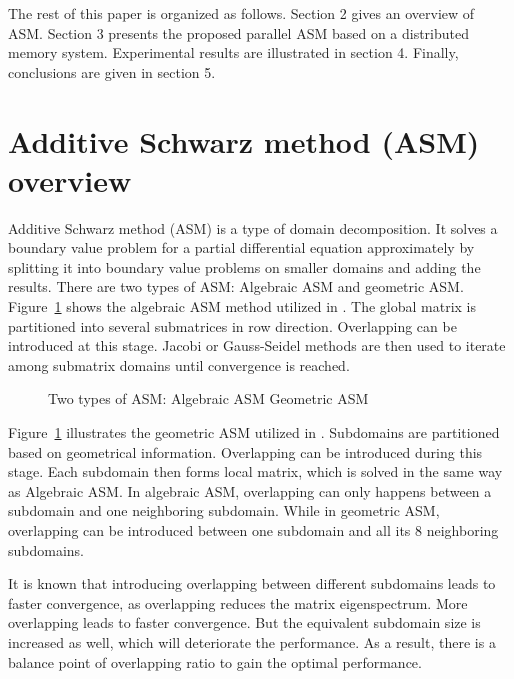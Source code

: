 \documentclass{sig-alternate}
\begin{document}
	The rest of this paper is organized as follows. Section 2 gives an overview of ASM. Section 3 presents 
	the proposed parallel ASM based on a distributed memory system. Experimental results are illustrated in section 4. 
	Finally, conclusions are given in section 5.

\section{Additive Schwarz method (ASM) overview}	
	Additive Schwarz method (ASM) is a type of domain decomposition. It solves a boundary value problem for a partial 
	differential equation approximately by splitting it into boundary value problems on smaller domains and adding the results.
	There are two types of ASM: Algebraic ASM and geometric ASM. 
	Figure~\ref{Fig2} shows the algebraic ASM method utilized in \cite{kaisun}. The global matrix
	is partitioned into several submatrices in row direction. 
	Overlapping can be introduced at this stage. Jacobi or Gauss-Seidel methods are then used to iterate among submatrix domains until 
	convergence is reached.
	\begin{figure}[htbp]
	  \caption{Two types of ASM: 
	   Algebraic ASM
	   Geometric ASM}
	  \label{Fig2}
	\end{figure}
	Figure~\ref{Fig2} illustrates the geometric ASM utilized in \cite{Zhongyu}. Subdomains are partitioned based on
	geometrical information. Overlapping can be introduced during this stage. Each subdomain then forms local matrix, which is
	solved in the same way as Algebraic ASM.
	In algebraic ASM, overlapping can only happens between a subdomain and one neighboring subdomain. While in 
	geometric ASM, overlapping can be introduced between one subdomain and all its 8 neighboring subdomains.
	
	It is known that introducing overlapping between different subdomains leads to faster convergence, 
	as overlapping reduces the matrix eigenspectrum\cite{Klawonn, Taopeng}. More overlapping leads to faster convergence.
	But the equivalent subdomain size is increased as well, which will deteriorate the performance. As a result, there is a 
	balance point of overlapping ratio to gain the optimal performance.
\end{document}
